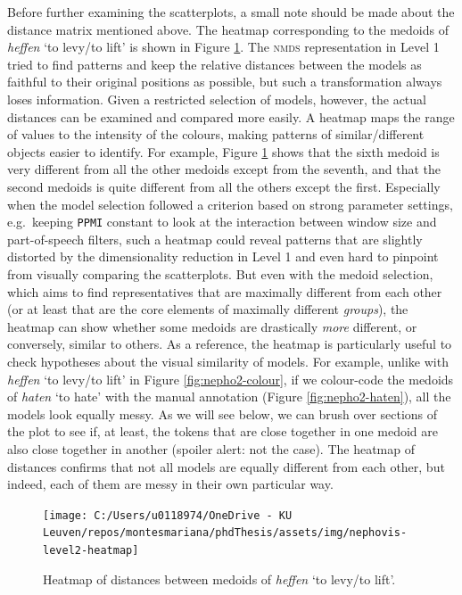 \documentclass[
]{book}
\begin{document}
Before further examining the scatterplots, a small note should be made about the distance matrix mentioned above. The heatmap corresponding to the medoids of \emph{heffen} `to levy/to lift' is shown in Figure \ref{fig:nepho2-heatmap}.
The \textsc{nmds} representation in Level 1 tried to find patterns and keep the relative distances between the models as faithful to their original positions as possible, but such a transformation always loses information. Given a restricted selection of models, however, the actual distances can be examined and compared more easily. A heatmap maps the range of values to the intensity of the colours, making patterns of similar/different objects easier to identify. For example, Figure \ref{fig:nepho2-heatmap} shows that the sixth medoid is very different from all the other medoids except from the seventh, and that the second medoids is quite different from all the others except the first. Especially when the model selection followed a criterion based on strong parameter settings, e.g.~keeping \texttt{PPMI} constant to look at the interaction between window size and part-of-speech filters, such a heatmap could reveal patterns that are slightly distorted by the dimensionality reduction in Level 1 and even hard to pinpoint from visually comparing the scatterplots. But even with the medoid selection, which aims to find representatives that are maximally different from each other (or at least that are the core elements of maximally different \emph{groups}), the heatmap can show whether some medoids are drastically \emph{more} different, or conversely, similar to others.
As a reference, the heatmap is particularly useful to check hypotheses about the visual similarity of models. For example, unlike with \emph{heffen} `to levy/to lift' in Figure \ref{fig:nepho2-colour}, if we colour-code the medoids of \emph{haten} `to hate' with the manual annotation (Figure \ref{fig:nepho2-haten}), all the models look equally messy. As we will see below, we can brush over sections of the plot to see if, at least, the tokens that are close together in one medoid are also close together in another (spoiler alert: not the case). The heatmap of distances confirms that not all models are equally different from each other, but indeed, each of them are messy in their own particular way.



\begin{figure}
\texttt{[image: C:/Users/u0118974/OneDrive - KU Leuven/repos/montesmariana/phdThesis/assets/img/nephovis-level2-heatmap]} \caption{Heatmap of distances between medoids of \emph{heffen} `to levy/to lift'.}\label{fig:nepho2-heatmap}
\end{figure}
\end{document}
